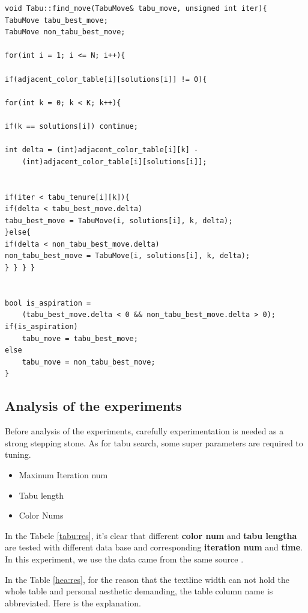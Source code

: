 \documentclass[10pt, a4paper, twocolumn]{article} %
\begin{document}
\begin{lstlisting}
void Tabu::find_move(TabuMove& tabu_move, unsigned int iter){
TabuMove tabu_best_move;
TabuMove non_tabu_best_move;

for(int i = 1; i <= N; i++){

if(adjacent_color_table[i][solutions[i]] != 0){

for(int k = 0; k < K; k++){

if(k == solutions[i]) continue;

int delta = (int)adjacent_color_table[i][k] -
    (int)adjacent_color_table[i][solutions[i]];


if(iter < tabu_tenure[i][k]){
if(delta < tabu_best_move.delta)
tabu_best_move = TabuMove(i, solutions[i], k, delta);
}else{
if(delta < non_tabu_best_move.delta)
non_tabu_best_move = TabuMove(i, solutions[i], k, delta);
} } } }


bool is_aspiration =
    (tabu_best_move.delta < 0 && non_tabu_best_move.delta > 0);
if(is_aspiration)
    tabu_move = tabu_best_move;
else
    tabu_move = non_tabu_best_move;
}
\end{lstlisting}

\subsection{Analysis of the experiments}

Before analysis of the experiments, carefully experimentation is needed as a
strong stepping stone. As for tabu search, some super parameters are required to
tuning.
\begin{itemize}
	\item Maxinum Iteration num
	\item Tabu length
    \item Color Nums
\end{itemize}



In the Tabele \ref{tabu:res}, it's clear that different \textbf{color num} and
\textbf{tabu lengtha} are tested with different data base and corresponding
\textbf{iteration num} and \textbf{time}. In this experiment, we use the data
came from the same source \citep{Reference1}.

In the Table \ref{hea:res}, for the reason that the textline width can not hold
the whole table and personal aesthetic demanding, the table column name is
abbreviated. Here is the explanation.
\end{document}

